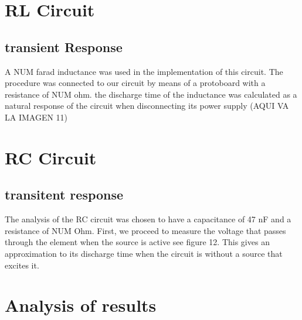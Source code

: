 \documentclass[conference]{IEEEtran}
\begin{document}
	\section{RL Circuit}
	\subsection{transient Response }
	A NUM farad inductance was used in the implementation of this circuit. The procedure was connected to our circuit by means of a protoboard with a resistance of NUM ohm. the discharge time of the inductance was calculated as a natural response of the circuit when disconnecting its power supply
	(AQUI VA LA IMAGEN 11)
	\section{RC Circuit }
	\subsection{transitent response}
	The analysis of the RC circuit was chosen to have a capacitance of 47 nF and a resistance of NUM Ohm. First, we proceed to measure the voltage that passes through the element when the source is active see figure 12. This gives an approximation to its discharge time when the circuit is without a source that excites it.
	\section{Analysis of results }
	
	
\end{document}
